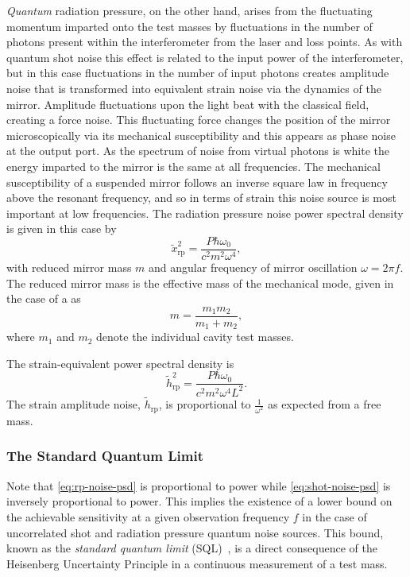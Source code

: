 \emph{Quantum} radiation pressure, on the other hand, arises from the fluctuating momentum imparted onto the test masses by fluctuations in the number of photons present within the interferometer from the laser and loss points. As with quantum shot noise this effect is related to the input power of the interferometer, but in this case fluctuations in the number of input photons creates amplitude noise that is transformed into equivalent strain noise via the dynamics of the mirror. Amplitude fluctuations upon the light beat with the classical field, creating a force noise. This fluctuating force changes the position of the mirror microscopically via its mechanical susceptibility and this appears as phase noise at the output port. As the spectrum of noise from virtual photons is white the energy imparted to the mirror is the same at all frequencies. The mechanical susceptibility of a suspended mirror follows an inverse square law in frequency above the resonant frequency, and so in terms of strain this noise source is most important at low frequencies. The radiation pressure noise power spectral density is given in this case by
\begin{equation}
  \label{eq:rp-noise-psd}
  \tilde{x}^2_{\text{rp}} = \frac{P \hbar \omega_0}{c^2 m^2 \omega^4},
\end{equation}
with reduced mirror mass $m$ and angular frequency of mirror oscillation $\omega = 2 \pi f$. The reduced mirror mass is the effective mass of the mechanical mode, given in the case of a \FPMI{} as
\begin{equation}
  m = \frac{m_1 m_2}{m_1 + m_2},
\end{equation}
where $m_1$ and $m_2$ denote the individual cavity test masses.

The strain-equivalent power spectral density is
\begin{equation}
  \tilde{h}^2_{\text{rp}} = \frac{P \hbar \omega_0}{c^2 m^2 \omega^4 L^2}.
\end{equation}
The strain amplitude noise, $\tilde{h}_{\text{rp}}$, is proportional to $\frac{1}{\omega^2}$ as expected from a free mass.

\subsubsection{\label{sec:sql}The Standard Quantum Limit}
Note that \cref{eq:rp-noise-psd} is proportional to power while \cref{eq:shot-noise-psd} is inversely proportional to power. This implies the existence of a lower bound on the achievable sensitivity at a given observation frequency $f$ in the case of uncorrelated shot and radiation pressure quantum noise sources. This bound, known as the \emph{standard quantum limit} (\gls{SQL})~\cite{Braginsky1967}, is a direct consequence of the Heisenberg Uncertainty Principle in a continuous measurement of a test mass.

